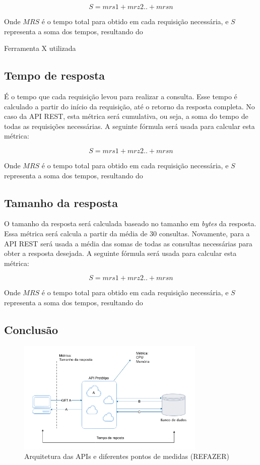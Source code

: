 $$S=mrs1+mrz2..+mrsn$$

Onde $MRS$ é o tempo total para obtido em cada requisição necessária, e $S$ representa a soma dos tempos, resultando do 

Ferramenta X utilizada

\subsection*{Tempo de resposta}

É o tempo que cada requisição levou para realizar a consulta. Esse tempo é calculado a partir do início da requisição, até o retorno da resposta completa. No caso da API REST, esta métrica será cumulativa, ou seja, a soma do tempo de todas as requisições necessárias. A seguinte fórmula será usada para calcular esta métrica: 

$$S=mrs1+mrz2..+mrsn$$

Onde $MRS$ é o tempo total para obtido em cada requisição necessária, e $S$ representa a soma dos tempos, resultando do 

\subsection*{Tamanho da resposta}

O tamanho da resposta será calculada baseado no tamanho em \textit{bytes} da resposta. Essa métrica será calcula a partir da média de 30 consultas. Novamente, para a API REST será usada a média das somas de todas as consultas necessárias para obter a resposta desejada. A seguinte fórmula será usada para calcular esta métrica: 

$$S=mrs1+mrz2..+mrsn$$

Onde $MRS$ é o tempo total para obtido em cada requisição necessária, e $S$ representa a soma dos tempos, resultando do 

\subsection*{Conclusão}

\begin{figure}[htbp]
\centering
\includegraphics[width=0.8\textwidth]{figuras/metricas.png}
\caption{Arquitetura das APIs e diferentes pontos de medidas (REFAZER)}
\label{fig:my-metrics}
\author{fonte: Autor}
\end{figure}

